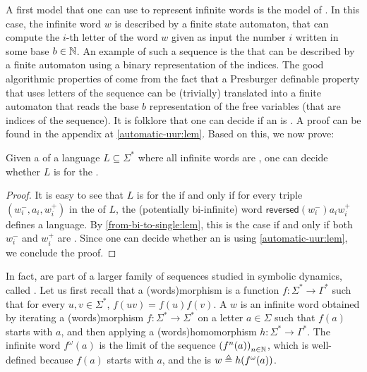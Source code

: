 \AP A first model that one can use to represent infinite words is the model of
. In this case, the infinite word $w$ is described
by a finite state automaton, that can compute the $i$-th letter of the word $w$
given as input the number $i$ written in some base $b \in \mathbb{N}$. An example of
such a sequence is the  that can be described by a
finite automaton using a binary representation of the indices. The good
algorithmic properties of  come from the fact that a
Presburger definable property that uses letters of the sequence can be
(trivially) translated into a finite automaton that reads the base $b$
representation of the free variables (that are indices of the sequence). It is
folklore that one can decide if an  is . A proof can be found in the appendix at
\cref{automatic-uur:lem}. Based on this, we now prove:


\begin{theorem}
    \label{automatic-wqo:thm}
    Given a  of a language $L \subseteq
    \Sigma^*$ where all infinite words are , one can
    decide whether $L$ is  for the .
\end{theorem}
\begin{proof}
    It is easy to see that $L$ is  for the  if and only if for every triple $(w_i^-, a_i, w_i^+)$ in the
     of $L$, the (potentially bi-infinite) word
    $\mathsf{reversed}(w_i^-) a_i w_i^+$ defines a 
    language. By \cref{from-bi-to-single:lem}, this is the case if and only if
    both $w_i^-$ and $w_i^+$ are . 
    Since one can decide whether an  is
     using \cref{automatic-uur:lem},
    we conclude the proof.
\end{proof}


\AP In fact,  are part of a larger family of sequences
studied in symbolic dynamics, called . Let us first
recall that a \intro(words){morphism} is a function $f \colon \Sigma^* \to
\Gamma^*$ such that for every $u,v \in \Sigma^*$, $f(uv) = f(u)f(v)$. A
 $w$ is an infinite word obtained by iterating a
\kl(words){morphism} $f \colon \Sigma^* \to \Sigma^*$ on a letter $a \in
\Sigma$ such that $f(a)$ starts with $a$, and then applying a
\kl(words){homomorphism} $h \colon \Sigma^* \to \Gamma^*$. The infinite word
$f^\omega(a)$ is the limit of the sequence $\seqof{f^n(a)}[n \in \Nat]$, which
is well-defined because $f(a)$ starts with $a$, and the 
is $ w \triangleq h(f^\omega(a))$. 

